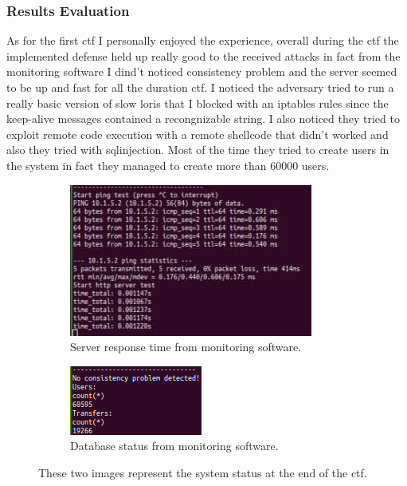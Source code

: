 \documentclass[14pt]{article}
\begin{document}
\subsubsection{Results Evaluation}
As for the first ctf I personally enjoyed the experience, overall during the ctf the implemented defense held up really good to the received attacks in fact from the monitoring software I dind't noticed consistency problem and the server seemed to be up and fast for all the duration ctf. I noticed the adversary tried to run a really basic version of slow loris that I blocked with an iptables rules since the keep-alive messages contained a recongnizable string. I also noticed they tried to exploit remote code execution with a remote shellcode that didn't worked and also they tried with sqlinjection. Most of the time they tried to create users in the system in fact they managed to create more than 60000 users. 

\begin{figure}[h!]
	\centering
	\begin{subfigure}[b]{0.35\linewidth}
		\includegraphics[width=\linewidth]{server_response_time}
		\caption{Server response time from monitoring software.}
	\end{subfigure}
	\begin{subfigure}[b]{0.3\linewidth}
		\includegraphics[width=\linewidth]{db_status}
		\caption{Database status from monitoring software.}
	\end{subfigure}
	\caption{These two images represent the system status at the end of the ctf.}
\end{figure}
\end{document}
